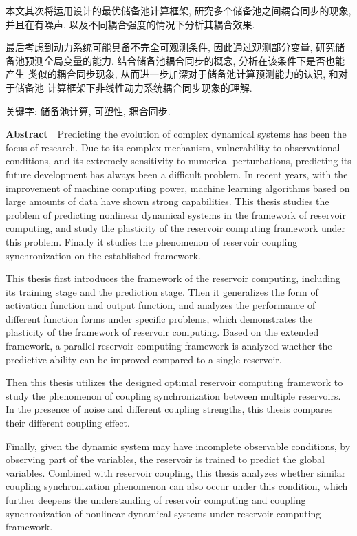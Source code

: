 \documentclass[notitlepage,cs4size,punct,oneside]{ctexrep}
\numberwithin{equation}{chapter}
\theoremstyle{mystyle}
\begin{document}
本文其次将运用设计的最优储备池计算框架, 研究多个储备池之间耦合同步的现象, 
并且在有噪声, 以及不同耦合强度的情况下分析其耦合效果. %

最后考虑到动力系统可能具备不完全可观测条件, 因此通过观测部分变量, 
研究储备池预测全局变量的能力. 结合储备池耦合同步的概念, 分析在该条件下是否也能产生
类似的耦合同步现象, 从而进一步加深对于储备池计算预测能力的认识, 和对于储备池
计算框架下非线性动力系统耦合同步现象的理解. 

{\heiti 关键字: } 储备池计算, 可塑性, 耦合同步.

\clearpage

{\textbf{Abstract}\ \ }Predicting the evolution of complex dynamical systems 
has been the focus of research. Due to its complex mechanism, vulnerability 
to observational conditions, and its extremely sensitivity to numerical 
perturbations, predicting its future development has always been a difficult 
problem. In recent years, with the improvement of machine computing power, 
machine learning algorithms based on large amounts of data have shown strong 
capabilities. This thesis studies the problem of predicting nonlinear dynamical 
systems in the framework of reservoir computing, and study the plasticity of 
the reservoir computing framework under this problem. Finally it studies the 
phenomenon of reservoir coupling synchronization on the established framework.

This thesis first introduces the framework of the reservoir computing, 
including its training stage and the prediction stage. Then it generalizes 
the form of activation function and output function, 
and analyzes the performance of different function forms under specific problems,
which demonstrates the plasticity of the framework of reservoir computing. 
Based on the extended framework, a parallel reservoir computing framework is 
analyzed whether the predictive ability can be improved compared to a 
single reservoir.

Then this thesis utilizes the designed optimal reservoir computing framework 
to study the phenomenon of coupling synchronization between multiple reservoirs.
In the presence of noise and different coupling strengths, this thesis compares 
their different coupling effect.

Finally, given the dynamic system may have incomplete observable conditions, 
by observing part of the variables, the reservoir is trained to predict the global 
variables. Combined with reservoir coupling, this thesis analyzes whether similar 
coupling synchronization phenomenon can also occur under this condition, 
which further deepens the understanding of reservoir computing and coupling 
synchronization of nonlinear dynamical systems under reservoir computing framework. 
\end{document}
